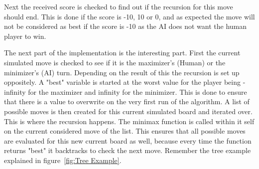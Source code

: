 Next the received score is checked to find out if the recursion for this move should end. This is done if the score is -10, 10 or 0, 
and as expected the move will not be considered as best 
if the score is -10 as the AI does not want the human player to win.

The next part of the implementation is the interesting part. First the current simulated move is checked to see if it is the maximizer's (Human) or the minimizer's (AI) turn. 
Depending on the result of this the recursion is set up oppositely. A "best" variable is started at the worst value for the player being 
-infinity for the maximizer and infinity for the minimizer. This is done to ensure that there is a value to overwrite on the very first run of the algorithm.
A list of possible moves is then created for this current simulated board and iterated over. This is where the recursion happens.
The minimax function is called within it self on the current considered move of the list. This ensures that all possible moves are evaluated for this new current board as well, 
because every time the function returns "best" it backtracks to check the next move. Remember the tree example explained in figure~\ref{fig:Tree Example}.
\clearpage